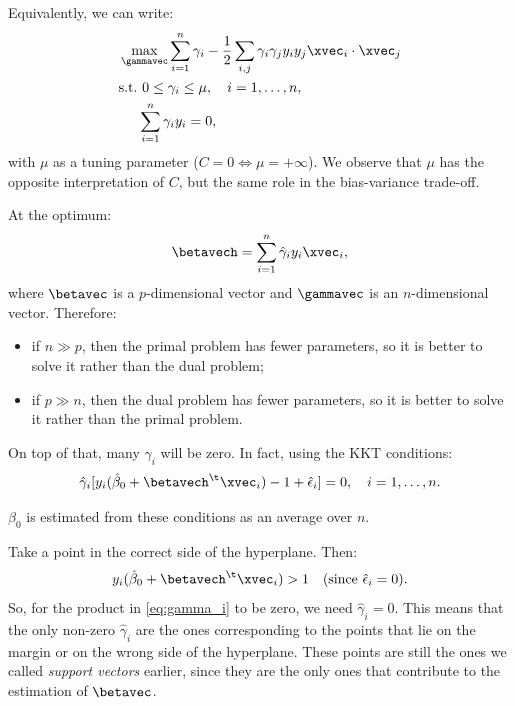 Equivalently, we can write:
\begin{equation}
    \begin{aligned}
         & \max_{\gammavec} \sum_{i=1}^n \gamma_i - \frac{1}{2}\sum_{i,j} \gamma_i\gamma_j y_i y_j \xvec_i\cdot\xvec_j \\
         & \text{s.t.\@ } 0 \leq \gamma_i \leq \mu, \quad i = 1, \dots, n,                                               \\
         & \phantom{s.t. } \sum_{i=1}^n \gamma_i y_i = 0,
    \end{aligned}
\end{equation}
with $\mu$ as a tuning parameter ($C = 0 \iff \mu = +\infty$). We observe that $\mu$ has the opposite interpretation of $C$, but the same role in the bias-variance trade-off.

At the optimum:
\begin{equation}
    \betavech = \sum_{i = 1}^n \hat{\gamma}_i y_i \xvec_i,
\end{equation}
where $\betavec$ is a $p$-dimensional vector and $\gammavec$ is an $n$-dimensional vector. Therefore:
\begin{itemize}[beginpenalty=10000]
    \item if $n \gg p$, then the primal problem has fewer parameters, so it is better to solve it rather than the dual problem;
    \item if $p \gg n$, then the dual problem has fewer parameters, so it is better to solve it rather than the primal problem.
\end{itemize}
On top of that, many $\gamma_i$ will be zero. In fact, using the KKT conditions:
\begin{equation}\label{eq:gamma_i}
    \hat{\gamma}_i[y_i(\hat{\beta}_0 + \betavech^\t\xvec_i) - 1 + \hat{\epsilon}_i] = 0, \quad i = 1, \dots, n.
\end{equation}
\begin{note}
    $\beta_0$ is estimated from these conditions as an average over $n$.
\end{note}
Take a point in the correct side of the hyperplane. Then:
\begin{equation}
    y_i(\hat{\beta}_0 + \betavech^\t\xvec_i) > 1\quad (\text{since } \hat{\epsilon}_i = 0).
\end{equation}
So, for the product in \eqref{eq:gamma_i} to be zero, we need $\hat{\gamma}_i = 0$. This means that the only non-zero $\hat{\gamma}_i$ are the ones corresponding to the points that lie on the margin or on the wrong side of the hyperplane. These points are still the ones we called \emph{support vectors} earlier, since they are the only ones that contribute to the estimation of $\betavec$.